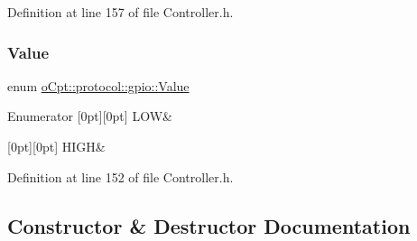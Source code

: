 Definition at line 157 of file Controller.\+h.

\hypertarget{classo_cpt_1_1protocol_1_1gpio_a7d2d1d34f177f209ad642098d168656f}{}\label{classo_cpt_1_1protocol_1_1gpio_a7d2d1d34f177f209ad642098d168656f} 
\subsubsection{\texorpdfstring{Value}{Value}}
{\footnotesize\ttfamily enum \hyperlink{classo_cpt_1_1protocol_1_1gpio_a7d2d1d34f177f209ad642098d168656f}{o\+Cpt\+::protocol\+::gpio\+::\+Value}}

\begin{DoxyEnumFields}{Enumerator}
[0pt][0pt]{}\hypertarget{classo_cpt_1_1protocol_1_1gpio_a7d2d1d34f177f209ad642098d168656faa2cdaa57258d16622e014ff5d766f095}{}\label{classo_cpt_1_1protocol_1_1gpio_a7d2d1d34f177f209ad642098d168656faa2cdaa57258d16622e014ff5d766f095} 
L\+OW&\\
\hline

[0pt][0pt]{}\hypertarget{classo_cpt_1_1protocol_1_1gpio_a7d2d1d34f177f209ad642098d168656fade5ff2955239ef2860ee2d06f3be68d4}{}\label{classo_cpt_1_1protocol_1_1gpio_a7d2d1d34f177f209ad642098d168656fade5ff2955239ef2860ee2d06f3be68d4} 
H\+I\+GH&\\
\hline

\end{DoxyEnumFields}


Definition at line 152 of file Controller.\+h.



\subsection{Constructor \& Destructor Documentation}
\hypertarget{classo_cpt_1_1protocol_1_1gpio_a8ceba8e1629d1d6e87da53eb097d81e5}{}\label{classo_cpt_1_1protocol_1_1gpio_a8ceba8e1629d1d6e87da53eb097d81e5} 
